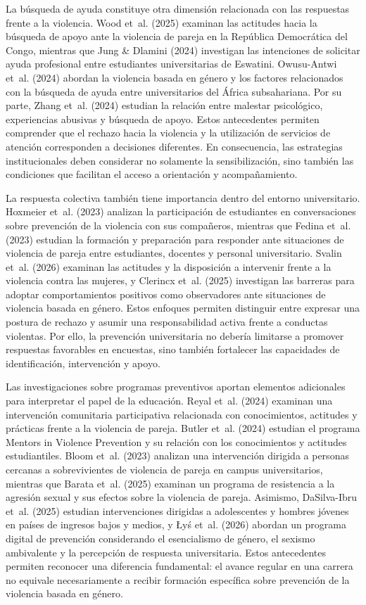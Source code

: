 \documentclass[
  spanish,
  11pt,
  letterpaper,
  DIV=11,
  numbers=noendperiod]{scrreprt}
\begin{document}
La búsqueda de ayuda constituye otra dimensión relacionada con las
respuestas frente a la violencia. Wood et~al. (2025) examinan las
actitudes hacia la búsqueda de apoyo ante la violencia de pareja en la
República Democrática del Congo, mientras que Jung \& Dlamini (2024)
investigan las intenciones de solicitar ayuda profesional entre
estudiantes universitarias de Eswatini. Owusu-Antwi et~al. (2024)
abordan la violencia basada en género y los factores relacionados con la
búsqueda de ayuda entre universitarios del África subsahariana. Por su
parte, Zhang et~al. (2024) estudian la relación entre malestar
psicológico, experiencias abusivas y búsqueda de apoyo. Estos
antecedentes permiten comprender que el rechazo hacia la violencia y la
utilización de servicios de atención corresponden a decisiones
diferentes. En consecuencia, las estrategias institucionales deben
considerar no solamente la sensibilización, sino también las condiciones
que facilitan el acceso a orientación y acompañamiento.

La respuesta colectiva también tiene importancia dentro del entorno
universitario. Hoxmeier et~al. (2023) analizan la participación de
estudiantes en conversaciones sobre prevención de la violencia con sus
compañeros, mientras que Fedina et~al. (2023) estudian la formación y
preparación para responder ante situaciones de violencia de pareja entre
estudiantes, docentes y personal universitario. Svalin et~al. (2026)
examinan las actitudes y la disposición a intervenir frente a la
violencia contra las mujeres, y Clerincx et~al. (2025) investigan las
barreras para adoptar comportamientos positivos como observadores ante
situaciones de violencia basada en género. Estos enfoques permiten
distinguir entre expresar una postura de rechazo y asumir una
responsabilidad activa frente a conductas violentas. Por ello, la
prevención universitaria no debería limitarse a promover respuestas
favorables en encuestas, sino también fortalecer las capacidades de
identificación, intervención y apoyo.

Las investigaciones sobre programas preventivos aportan elementos
adicionales para interpretar el papel de la educación. Reyal et~al.
(2024) examinan una intervención comunitaria participativa relacionada
con conocimientos, actitudes y prácticas frente a la violencia de
pareja. Butler et~al. (2024) estudian el programa Mentors in Violence
Prevention y su relación con los conocimientos y actitudes
estudiantiles. Bloom et~al. (2023) analizan una intervención dirigida a
personas cercanas a sobrevivientes de violencia de pareja en campus
universitarios, mientras que Barata et~al. (2025) examinan un programa
de resistencia a la agresión sexual y sus efectos sobre la violencia de
pareja. Asimismo, DaSilva-Ibru et~al. (2025) estudian intervenciones
dirigidas a adolescentes y hombres jóvenes en países de ingresos bajos y
medios, y Łyś et~al. (2026) abordan un programa digital de prevención
considerando el esencialismo de género, el sexismo ambivalente y la
percepción de respuesta universitaria. Estos antecedentes permiten
reconocer una diferencia fundamental: el avance regular en una carrera
no equivale necesariamente a recibir formación específica sobre
prevención de la violencia basada en género.
\end{document}
